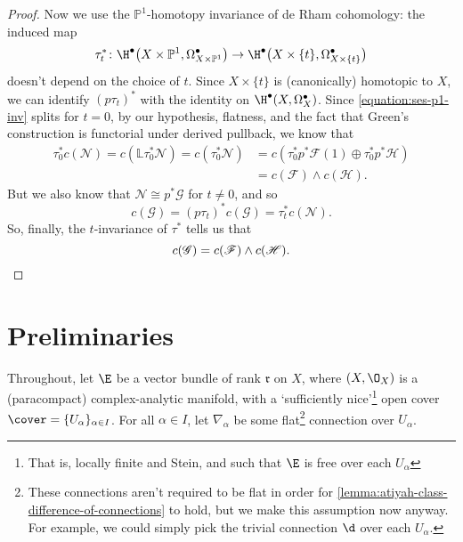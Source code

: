 \begin{proof}
        Now we use the $\mathbb{P}^1$-homotopy invariance of de Rham cohomology: the induced map
        \begin{equation*}
            \tau_t^*\colon\H^\bullet\big(X\times\mathbb{P}^1,\Omega_{X\times\mathbb{P}^1}^\bullet\big) \to \H^\bullet\big(X\times\{t\},\Omega_{X\times\{t\}}^\bullet\big)
        \end{equation*}
        doesn't depend on the choice of $t$.
        Since $X\times\{t\}$ is (canonically) homotopic to $X$, we can identify $(p\tau_t)^*$ with the identity on $\H^\bullet(X,\Omega_X^\bullet)$.
        Since \cref{equation:ses-p1-inv} splits for $t=0$, by our hypothesis, flatness, and the fact that Green's construction is functorial under derived pullback, we know that
        \begin{align*}
            \tau_0^*c(\mathscr{N}) = c(\mathbb{L}\tau_0^*\mathscr{N}) = c(\tau_0^*\mathscr{N}) &= c(\tau_0^*p^*\mathscr{F}(1)\oplus\tau_0^*p^*\mathscr{H})\\
            &= c(\mathscr{F})\wedge c(\mathscr{H}).
        \end{align*}
        But we also know that $\mathscr{N}\cong p^*\mathscr{G}$ for $t\neq0$, and so
        \begin{equation*}
            c(\mathscr{G}) = (p\tau_t)^*c(\mathscr{G}) = \tau_t^*c(\mathscr{N}).
        \end{equation*}
        So, finally, the $t$-invariance of $\tau^*$ tells us that
        \begin{equation*}
            c(\mathscr{G}) = c(\mathscr{F})\wedge c(\mathscr{H}).\qedhere
        \end{equation*}
    \end{proof}


\section{Preliminaries} %
\label{sec:preliminaries}

    Throughout, let $\E$ be a vector bundle of rank $\mathfrak{r}$ on $X$, where $(X,\O_X)$ is a (paracompact) complex-analytic manifold, with a `sufficiently nice'\footnote{That is, locally finite and Stein, and such that $\E$ is free over each $U_\alpha$} open cover $\cover=\{U_\alpha\}_{\alpha\in I}$.
    For all $\alpha\in I$, let $\nabla_\alpha$ be some flat\footnote{These connections aren't required to be flat in order for \cref{lemma:atiyah-class-difference-of-connections} to hold, but we make this assumption now anyway. For example, we could simply pick the trivial connection $\d$ over each $U_\alpha$.} connection over $U_\alpha$.

